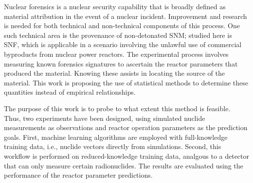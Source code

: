 Nuclear forensics is a nuclear security capability that is broadly defined as
material attribution in the event of a nuclear incident.  Improvement and
research is needed for both technical and non-technical components of this
process.  One such technical area is the provenance of non-detonated \gls{SNM};
studied here is \gls{SNF}, which is applicable in a scenario involving the
unlawful use of commercial byproducts from nuclear power reactors.  The
experimental process involves measuring known forensics signatures to ascertain
the reactor parameters that produced the material. Knowing these assists in
locating the source of the material. This work is proposing the use of
statistical methods to determine these quantities instead of empirical
relationships. 

The purpose of this work is to probe to what extent this method is feasible.
Thus, two experiments have been designed, using simulated nuclide measurements
as observations and reactor operation parameters as the prediction goals.
First, machine learning algorithms are employed with full-knowledge training
data, i.e., nuclide vectors directly from simulations.  Second, this workflow
is performed on reduced-knowledge training data, analgous to a detector that
can only measure certain radionuclides. The results are evaluated using the
performance of the reactor parameter predictions.

